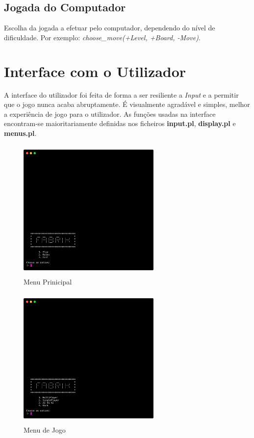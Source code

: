 \documentclass[a4paper]{article}
\begin{document}
\newpage

\subsection{Jogada do Computador} Escolha da jogada a efetuar pelo computador, dependendo do nível de dificuldade. Por exemplo: \textit{choose\_move(+Level, +Board, -Move)}.

\newpage

\section{Interface com o Utilizador}

A interface do utilizador foi feita de forma a ser resiliente a \textit{Input} e a permitir que o jogo nunca acaba abruptamente. É visualmente agradável e simples, melhor a experiência de jogo para o utilizador. As funções usadas na interface encontram-se maioritariamente definidas nos ficheiros \textbf{input.pl}, \textbf{display.pl} e \textbf{menus.pl}.

\begin{figure}[h!]
\begin{center}
\includegraphics[height=7cm,width=7cm]{images/fabrik_start.png}
\caption{Menu Prinicipal}
\label{Figura 1}
\end{center}
\end{figure}

\begin{figure}[h!]
\begin{center}
\includegraphics[height=7cm,width=7cm]{images/fabrik_menu.png}
\caption{Menu de Jogo}
\label{Figura 1}
\end{center}
\end{figure}
\end{document}
